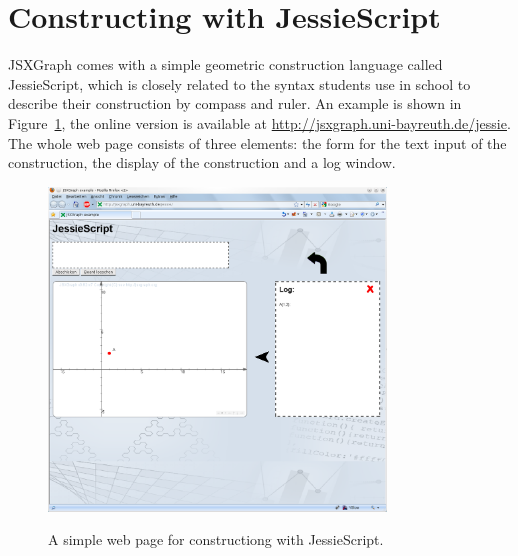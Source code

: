 \documentclass[12pt,a4paper]{article}%
\begin{document}
\section{Constructing with JessieScript}
JSXGraph comes with a simple geometric construction language called JessieScript, which is closely related to the syntax students use in school to describe their construction by compass and ruler. An example is shown in Figure~\ref{fig:jessiescript}, the online version is available at 
\href{http://jsxgraph.uni-bayreuth.de/jessie}{http://jsxgraph.uni-bayreuth.de/jessie}. 
The whole web page consists of three elements: the form for the text input of the construction, the display of the construction and a log window. 
\begin{figure}[ht]
\begin{center}
\includegraphics[width=0.8\textwidth]{jessiescript.png}\\
\caption{A simple web page for constructiong with JessieScript.}\label{fig:jessiescript}
\end{center}
\end{figure}
\end{document}
